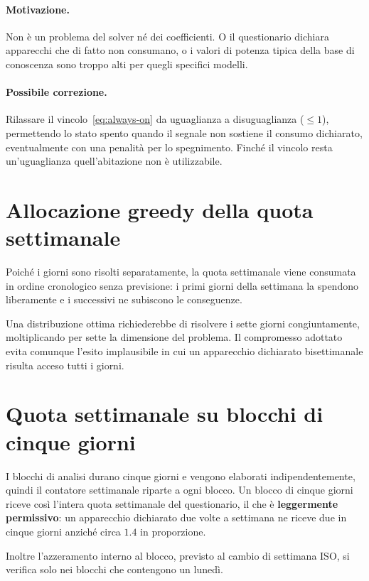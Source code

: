 \paragraph{Motivazione.} Non è un problema del solver né dei coefficienti. O il questionario dichiara
apparecchi che di fatto non consumano, o i valori di potenza tipica della base di conoscenza sono
troppo alti per quegli specifici modelli.

\paragraph{Possibile correzione.} Rilassare il vincolo~\eqref{eq:always-on} da uguaglianza a
disuguaglianza ($\le 1$), permettendo lo stato spento quando il segnale non sostiene il consumo
dichiarato, eventualmente con una penalità per lo spegnimento. Finché il vincolo resta
un'uguaglianza quell'abitazione non è utilizzabile.

\section{Allocazione greedy della quota settimanale}

Poiché i giorni sono risolti separatamente, la quota settimanale viene consumata in ordine
cronologico senza previsione: i primi giorni della settimana la spendono liberamente e i
successivi ne subiscono le conseguenze.

Una distribuzione ottima richiederebbe di risolvere i sette giorni congiuntamente, moltiplicando
per sette la dimensione del problema. Il compromesso adottato evita comunque l'esito implausibile
in cui un apparecchio dichiarato bisettimanale risulta acceso tutti i giorni.

\section{Quota settimanale su blocchi di cinque giorni}

I blocchi di analisi durano cinque giorni e vengono elaborati indipendentemente, quindi il
contatore settimanale riparte a ogni blocco. Un blocco di cinque giorni riceve così l'intera quota
settimanale del questionario, il che è \textbf{leggermente permissivo}: un apparecchio dichiarato
due volte a settimana ne riceve due in cinque giorni anziché circa $1.4$ in proporzione.

Inoltre l'azzeramento interno al blocco, previsto al cambio di settimana ISO, si verifica solo nei
blocchi che contengono un lunedì.


